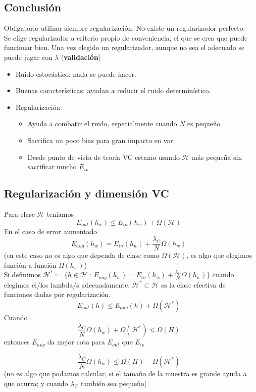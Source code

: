 \documentclass[11pt,a4paper]{article}
\theoremstyle{definition}
\begin{document}
	\subsection{Conclusión}
	Obligatorio utilizar siempre regularización. No existe un regularizador perfecto. Se elige regularizador a criterio propio de conveniencia, el que se crea que puede funcionar bien. Una vez elegido un regularizador, aunque no sea el adecuado se puede jugar con $\lambda$ (\textbf{validación})
	\begin{itemize}
		\item Ruido estocástico: nada se puede hacer.
		\item Buenas características: ayudan a reducir el ruido determinístico.
		\item Regularización:
		\begin{itemize}
			\item Ayuda a combatir el ruido, especialmente cuando $N$ es pequeño
			\item Sacrifica un poco bias para gran impacto en var
			\item Desde punto de vista de teoría VC estamo usando $\mathcal{H}$ más pequeña sin sacrificar mucho $E_{in}$
		\end{itemize}
	\end{itemize}
	\subsection{Regularización y dimensión VC}
	Para clase $\mathcal{H}$ teníamos
	$$E_{out}(h_w)\leq E_{in}(h_w)+\Omega(\mathcal{H})$$
	En el caso de error aumentado
	$$E_{aug}(h_w)=E_{in}(h_w)+\frac{\lambda_C}{N}\Omega(h_w)$$
	(en este caso no es algo que dependa de clase como $\Omega(\mathcal{H})$, es algo que elegimos función a función $\Omega(h_w)$)\\
	
	Si definimos $\mathcal{H}^*:=\{h\in \mathcal{H}\ : \ E_{aug}(h_w)=E_{in}(h_w)+\frac{\lambda_C}{N}\Omega(h_w)\}$ cuando elegimos el/los lambda/s adecuadamente. $\mathcal{H}^*\subset \mathcal{H}$ es la clase efectiva de funciones dadas por regularización.
	$$E_{out}(h)\leq E_{aug}(h)+\Omega(\mathcal{H}^*)$$
	Cuando $$\frac{\lambda_C}{N}\Omega(h_w) + \Omega(\mathcal{H}^*)\leq \Omega(H)$$
	entonces $E_{aug}$ da mejor cota para $E_{out}$ que $E_{in}$
	
	$$\frac{\lambda_C}{N}\Omega(h_w) \leq \Omega(H) - \Omega(\mathcal{H}^*)$$
	(no es algo que podamos calcular, si el tamaño de la muestra es grande ayuda a que ocurra; y cuando $\lambda_C$ también sea pequeño)
\end{document}

